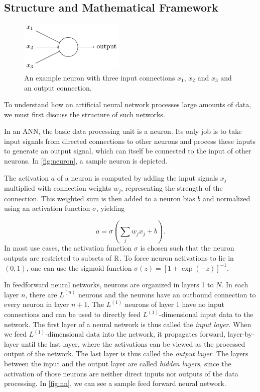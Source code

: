 \subsection{Structure and Mathematical Framework}

\begin{figure}
  \includegraphics[width=5cm]{media/neuron.png}
  \caption{
    An example neuron with three input connections $x_1$, $x_2$ and
    $x_3$ and an output connection. \cite{nielsen}
  }
  \label{fig:neuron}
\end{figure}
To understand how an artificial neural network processes large amounts of data,
we must first discuss the structure of such networks.

In an ANN, the basic data processing unit is a neuron. Its only job is to take
input signals from directed connections to other neurons and process these inputs to generate an output signal, which can itself be connected to the input of other neurons. In \autoref{fig:neuron}, a sample neuron is depicted.

The activation $a$ of a neuron is computed by adding the input signals $x_j$ multiplied with connection weights $w_j$, representing the strength of the connection. This weighted sum is then added to a neuron bias $b$ and normalized using an activation function $\sigma$, yielding

\begin{equation}
  a = \sigma\left(\sum_j w_j x_j + b\right).
\end{equation}
In most use cases, the activation function $\sigma$ is chosen such that the
neuron outputs are restricted to subsets of $\mathbb{R}$. To force neuron activations
to lie in $(0,1)$, one can use the sigmoid function
$\sigma(z) = [1+\exp(-z)]^{-1}$.

In feedforward neural networks, neurons are organized in layers 1 to $N$.
In each layer $n$, there are $L^{(n)}$ neurons and the neurons have an outbound connection to every neuron in layer $n+1$.
The $L^{(1)}$ neurons of layer 1 have no input connections and can be used to directly feed $L^{(1)}$-dimensional input data to the network.
The first layer of a neural network is thus called the \textit{input layer}.
When we feed $L^{(1)}$-dimensional data into the network, it propagates forward, layer-by-layer until the last layer, where the activations can be viewed as the processed output of the network. The last layer is thus called the \textit{output layer}.
The layers between the input and the output layer are called \textit{hidden layers}, since the activation of those neurons are neither direct inputs nor outputs of the data processing. In \autoref{fig:nn}, we can see a sample feed forward neural network.

